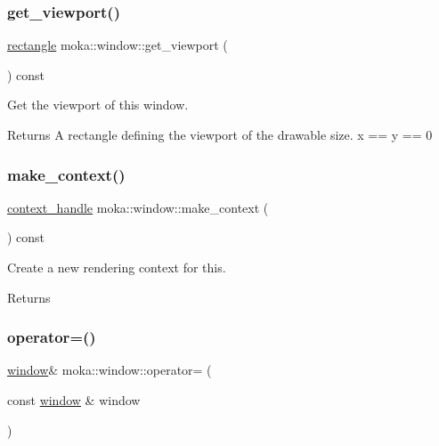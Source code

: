 \subsubsection{\texorpdfstring{get\_viewport()}{get\_viewport()}}
{\footnotesize\ttfamily \mbox{\hyperlink{namespacemoka_ab5e90635f0a0441cc99f2328bc34500d}{rectangle}} moka\+::window\+::get\+\_\+viewport (\begin{DoxyParamCaption}{ }\end{DoxyParamCaption}) const}



Get the viewport of this window. 

\begin{DoxyReturn}{Returns}
A rectangle defining the viewport of the drawable size. x == y == 0 
\end{DoxyReturn}
\mbox{\label{classmoka_1_1window_ab9372d21cceb71d9934f842ca5c6eab6}} 
\subsubsection{\texorpdfstring{make\_context()}{make\_context()}}
{\footnotesize\ttfamily \mbox{\hyperlink{structmoka_1_1context__handle}{context\+\_\+handle}} moka\+::window\+::make\+\_\+context (\begin{DoxyParamCaption}{ }\end{DoxyParamCaption}) const}



Create a new rendering context for this. 

\begin{DoxyReturn}{Returns}

\end{DoxyReturn}
\mbox{\label{classmoka_1_1window_ae6041c42675d2d9c6f82f512f7cd81a1}} 
\subsubsection{\texorpdfstring{operator=()}{operator=()}\hspace{0.1cm}{\footnotesize\ttfamily [1/2]}}
{\footnotesize\ttfamily \mbox{\hyperlink{classmoka_1_1window}{window}}\& moka\+::window\+::operator= (\begin{DoxyParamCaption}\item[{const \mbox{\hyperlink{classmoka_1_1window}{window}} \&}]{window }\end{DoxyParamCaption})\hspace{0.3cm}{\ttfamily [delete]}}


